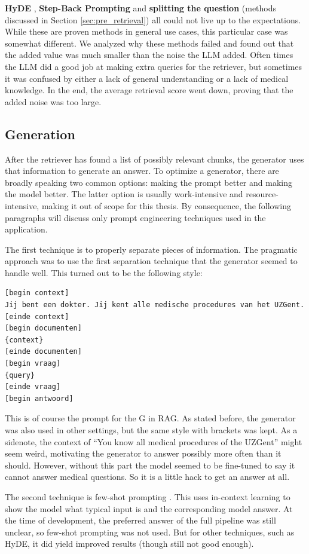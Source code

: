 \textbf{HyDE} \cite{gao2023precisehyde}, \textbf{Step-Back Prompting} \cite{zheng2023takeastepback} and \textbf{splitting the question} (methods discussed in Section \ref{sec:pre_retrieval}) all could not live up to the expectations. While these are proven methods in general use cases, this particular case was somewhat different. We analyzed why these methods failed and found out that the added value was much smaller than the noise the LLM added. Often times the LLM did a good job at making extra queries for the retriever, but sometimes it was confused by either a lack of general understanding or a lack of medical knowledge. In the end, the average retrieval score went down, proving that the added noise was too large.

\subsection{Generation}
After the retriever has found a list of possibly relevant chunks, the generator uses that information to generate an answer. To optimize a generator, there are broadly speaking two common options: making the prompt better and making the model better. The latter option is usually work-intensive and resource-intensive, making it out of scope for this thesis. By consequence, the following paragraphs will discuss only prompt engineering techniques used in the application.

The first technique is to properly separate pieces of information. The pragmatic approach was to use the first separation technique that the generator seemed to handle well. This turned out to be the following style:
\begin{verbatim}
[begin context]
Jij bent een dokter. Jij kent alle medische procedures van het UZGent.
[einde context]
[begin documenten]
{context}
[einde documenten]
[begin vraag]
{query}
[einde vraag]
[begin antwoord]
\end{verbatim}
This is of course the prompt for the G in RAG. As stated before, the generator was also used in other settings, but the same style with brackets was kept. As a sidenote, the context of ``You know all medical procedures of the UZGent'' might seem weird, motivating the generator to answer possibly more often than it should. However, without this part the model seemed to be fine-tuned to say it cannot answer medical questions. So it is a little hack to get an answer at all.

The second technique is few-shot prompting \cite{brown2020language}. This uses in-context learning to show the model what typical input is and the corresponding model answer. At the time of development, the preferred answer of the full pipeline was still unclear, so few-shot prompting was not used. But for other techniques, such as HyDE, it did yield improved results (though still not good enough). 


